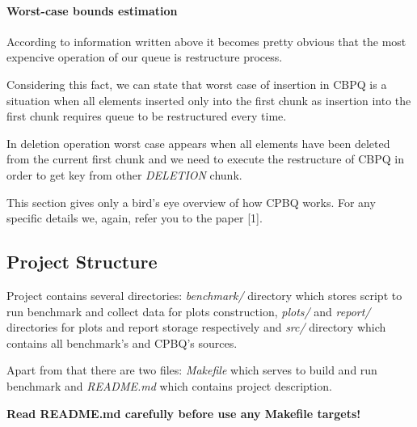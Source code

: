 \documentclass{article}
\begin{document}
\paragraph{Worst-case bounds estimation}\mbox{}\par 
According to information written above it becomes pretty obvious that the most expencive operation of our queue is restructure process.\par
Considering this fact, we can state that worst case of insertion in CBPQ is a situation when all elements inserted only into the first chunk as insertion into the first chunk requires queue to be restructured every time.\par
In deletion operation worst case appears when all elements have been deleted from the current first chunk and we need to execute the restructure of CBPQ in order to get key from other \emph{DELETION} chunk.\newline\par
This section gives only a bird's eye overview of how CPBQ works. For any specific details we, again, refer you to the paper [1].

\subsection{Project Structure}
Project contains several directories:\textit{ benchmark/} directory which stores script to run benchmark and collect data for plots construction, \textit{plots/} and \textit{report/} directories for plots and report storage respectively and \textit{src/} directory which contains all benchmark's and CPBQ's sources.\par
Apart from that there are two files: \textit{Makefile} which serves to build and run benchmark and \textit{README.md} which contains project description.\par
\textbf{Read README.md carefully before use any Makefile targets!}
\end{document}
